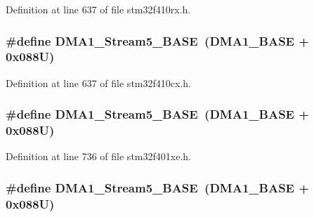Definition at line 637 of file stm32f410rx.\+h.

\subsubsection[{\texorpdfstring{D\+M\+A1\+\_\+\+Stream5\+\_\+\+B\+A\+SE}{DMA1_Stream5_BASE}}]{\setlength{\rightskip}{0pt plus 5cm}\#define D\+M\+A1\+\_\+\+Stream5\+\_\+\+B\+A\+SE~({\bf D\+M\+A1\+\_\+\+B\+A\+SE} + 0x088\+U)}\hypertarget{group___peripheral__registers__structures_ga0ded7bed8969fe2e2d616e7f90eb7654}{}\label{group___peripheral__registers__structures_ga0ded7bed8969fe2e2d616e7f90eb7654}


Definition at line 637 of file stm32f410cx.\+h.

\subsubsection[{\texorpdfstring{D\+M\+A1\+\_\+\+Stream5\+\_\+\+B\+A\+SE}{DMA1_Stream5_BASE}}]{\setlength{\rightskip}{0pt plus 5cm}\#define D\+M\+A1\+\_\+\+Stream5\+\_\+\+B\+A\+SE~({\bf D\+M\+A1\+\_\+\+B\+A\+SE} + 0x088\+U)}\hypertarget{group___peripheral__registers__structures_ga0ded7bed8969fe2e2d616e7f90eb7654}{}\label{group___peripheral__registers__structures_ga0ded7bed8969fe2e2d616e7f90eb7654}


Definition at line 736 of file stm32f401xe.\+h.

\subsubsection[{\texorpdfstring{D\+M\+A1\+\_\+\+Stream5\+\_\+\+B\+A\+SE}{DMA1_Stream5_BASE}}]{\setlength{\rightskip}{0pt plus 5cm}\#define D\+M\+A1\+\_\+\+Stream5\+\_\+\+B\+A\+SE~({\bf D\+M\+A1\+\_\+\+B\+A\+SE} + 0x088\+U)}\hypertarget{group___peripheral__registers__structures_ga0ded7bed8969fe2e2d616e7f90eb7654}{}\label{group___peripheral__registers__structures_ga0ded7bed8969fe2e2d616e7f90eb7654}


